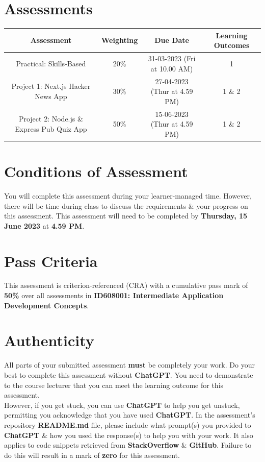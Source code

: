 \documentclass{article}
\begin{document}
\section*{Assessments}
\renewcommand{\arraystretch}{1.5}
\begin{tabular}{|c|c|c|c|}
	\hline
	\textbf{Assessment}                                 & \textbf{Weighting} & \textbf{Due Date}            & \textbf{Learning Outcomes} \\ \hline
	\small Practical: Skills-Based & \small 20\%        & \small 31-03-2023 (Fri at 10.00 AM)   & \small 1                   \\ \hline
	\small Project 1: Next.js Hacker News App             & \small 30\%        & \small 27-04-2023 (Thur at 4.59 PM)  & \small 1 \& 2                   \\ \hline
	\small Project 2: Node.js \& Express Pub Quiz App                       & \small 50\%        & \small 15-06-2023 (Thur at 4.59 PM)  & \small 1 \& 2                   \\ \hline
\end{tabular}

\section*{Conditions of Assessment}
You will complete this assessment during your learner-managed time. However, there will be time during class to discuss the requirements \& your progress on this assessment. This assessment will need to be completed by \textbf{Thursday, 15 June 2023} at \textbf{4.59 PM}.

\section*{Pass Criteria}
This assessment is criterion-referenced (CRA) with a cumulative pass mark of \textbf{50\%} over all assessments in \textbf{ID608001: Intermediate Application Development Concepts}.

\section*{Authenticity}
All parts of your submitted assessment \textbf{must} be completely your work. Do your best to complete this assessment without \textbf{ChatGPT}. You need to demonstrate to the course lecturer that you can meet the learning outcome for this assessment. \\
 
 However, if you get stuck, you can use \textbf{ChatGPT} to help you get unstuck, permitting you acknowledge that you have used \textbf{ChatGPT}. In the assessment's repository \textbf{README.md} file, please include what prompt(s) you provided to \textbf{ChatGPT} \& how you used the response(s) to help you with your work. It also applies to code snippets retrieved from \textbf{StackOverflow} \& \textbf{GitHub}. Failure to do this will result in a mark of \textbf{zero} for this assessment.
\end{document}
